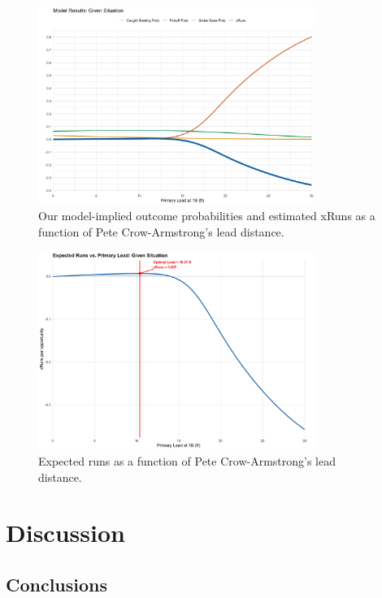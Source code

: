 \documentclass[12pt,letterpaper]{article}
\begin{document}
\begin{figure}[H]
    \centering
    \includegraphics[width=0.8\textwidth]{figures/pca-probs.png}
    \caption{Our model-implied outcome probabilities and estimated xRuns as a function of Pete Crow-Armstrong's lead distance.}
    \label{fig:implied_probs}
\end{figure}
\begin{figure}[H]
    \centering
    \includegraphics[width=0.8\textwidth]{figures/pca-xruns.png}
    \caption{Expected runs as a function of Pete Crow-Armstrong's lead distance.}
    \label{fig:optimal_lead}
\end{figure}

\section{Discussion}

\subsection{Conclusions}
\end{document}
